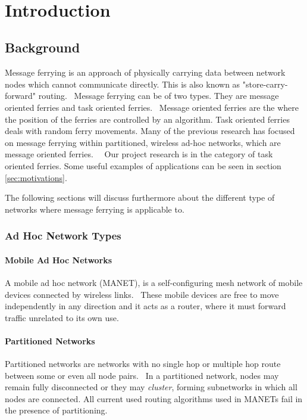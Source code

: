~\cite{adhocmsgferry}
~\cite{hybrid}
~\cite{Routing}
~\cite{wearable}
~\cite{QoSrouting}
~\cite{efficientrouting}
~\cite{implement}
~\cite{book1}

\chapter{Introduction} 

\section{Background}
Message ferrying is an approach of physically carrying data between network nodes which cannot communicate directly.
This is also known as "store-carry-forward" routing.~\cite{Routing}
Message ferrying can be of two types.  
They are message oriented ferries and task oriented ferries.~\cite{hybrid}
Message oriented ferries are the where the position of the ferries are controlled by an algorithm.  Task oriented ferries deals with random ferry movements.
Many of the previous research has focused on message ferrying within partitioned, wireless ad-hoc networks, which are message oriented ferries.~\cite{Routing}~\cite{adhocmsgferry}	
Our project research is in the category of task oriented ferries.
Some useful examples of applications can be seen in section \ref{sec:motivations}.

The following sections will discuss furthermore about the different type of networks where message ferrying is applicable to.
\subsection{Ad Hoc Network Types}
\subsubsection{Mobile Ad Hoc Networks}
A mobile ad hoc network (MANET),  is a self-configuring mesh network of mobile devices connected by wireless links.~\cite{book1}
These mobile devices are free to move independently in any direction and it acts as a router, where it must forward traffic unrelated to its own use.

\subsubsection{Partitioned Networks}
Partitioned networks are networks with no single hop or multiple hop route between some or even all node pairs.~\cite{hybrid}
In a partitioned network, nodes may remain fully disconnected or they may \emph{cluster}, forming subnetworks in which all nodes are connected.
All current used routing algorithms used in MANETs %
fail in the presence of partitioning.~\cite{Routing}

